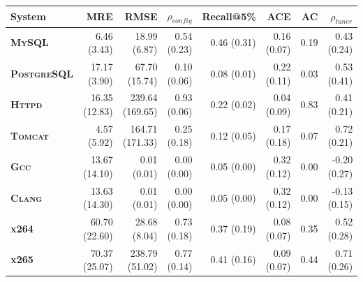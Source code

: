 \begin{tabular}{lrrrrrrr}
\toprule
\textbf{System} & \textbf{MRE} & \textbf{RMSE} & \textbf{$\rho_{config}$} & \textbf{Recall@5\%} & \textbf{ACE} & \textbf{AC} & \textbf{$\rho_{tuner}$} \\
\midrule
\textbf{\textsc{MySQL}} & 6.46 (3.43) & 18.99 (6.87) & 0.54 (0.23) & 0.46 (0.31) & 0.16 (0.07) & 0.19 & 0.43 (0.24) \\
\textbf{\textsc{PostgreSQL}} & 17.17 (3.90) & 67.70 (15.74) & 0.10 (0.06) & 0.08 (0.01) & 0.22 (0.11) & 0.03 & 0.53 (0.41) \\
\textbf{\textsc{Httpd}} & 16.35 (12.83) & 239.64 (169.65) & 0.93 (0.06) & 0.22 (0.02) & 0.04 (0.09) & 0.83 & 0.41 (0.21) \\
\textbf{\textsc{Tomcat}} & 4.57 (5.92) & 164.71 (171.33) & 0.25 (0.18) & 0.12 (0.05) & 0.17 (0.18) & 0.07 & 0.72 (0.21) \\
\textbf{\textsc{Gcc}} & 13.67 (14.10) & 0.01 (0.01) & 0.00 (0.00) & 0.05 (0.00) & 0.32 (0.12) & 0.00 & -0.20 (0.27) \\
\textbf{\textsc{Clang}} & 13.63 (14.30) & 0.01 (0.01) & 0.00 (0.00) & 0.05 (0.00) & 0.32 (0.12) & 0.00 & -0.13 (0.15) \\
\textbf{\textsc{x264}} & 60.70 (22.60) & 28.68 (8.04) & 0.73 (0.18) & 0.37 (0.19) & 0.08 (0.07) & 0.35 & 0.52 (0.28) \\
\textbf{\textsc{x265}} & 70.37 (25.07) & 238.79 (51.02) & 0.77 (0.14) & 0.41 (0.16) & 0.09 (0.07) & 0.44 & 0.71 (0.26) \\
\bottomrule
\end{tabular}
